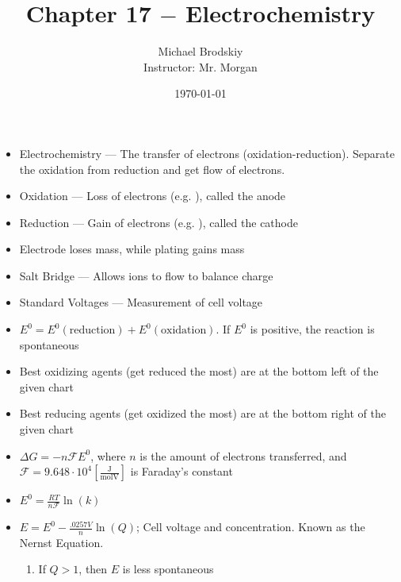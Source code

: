 \documentclass[12pt]{article}
\title{Chapter 17 $-$ Electrochemistry}
\date{\today}
\author{Michael Brodskiy\\ \small Instructor: Mr. Morgan}
\begin{document}
\maketitle

\begin{itemize}

  \item Electrochemistry — The transfer of electrons (oxidation-reduction). Separate the oxidation from reduction and get flow of electrons.

  \item Oxidation — Loss of electrons (e.g. ), called the anode

  \item Reduction — Gain of electrons (e.g. ), called the cathode

  \item Electrode loses mass, while plating gains mass

  \item Salt Bridge — Allows ions to flow to balance charge

  \item Standard Voltages — Measurement of cell voltage

  \item $E^0=E^0(\text{reduction})+E^0(\text{oxidation})$. If $E^0$ is positive, the reaction is spontaneous

  \item Best oxidizing agents (get reduced the most) are at the bottom left of the given chart

  \item Best reducing agents (get oxidized the most) are at the bottom right of the given chart

  \item $\Delta G=-n\mathcal{F}E^0$, where $n$ is the amount of electrons transferred, and $\mathcal{F}=9.648\cdot10^4\left[ \frac{\si{\joule}}{\si{\mole\volt}} \right]$ is Faraday's constant

  \item $E^0=\frac{RT}{n\mathcal{F}}\ln(k)$ 
    
  \item $E=E^0 -\frac{.0257V}{n}\ln(Q)$; Cell voltage and concentration. Known as the Nernst Equation.

    \begin{enumerate}

      \item If $Q>1$, then $E$ is less spontaneous


\end{enumerate}
\end{itemize}
\end{document}
